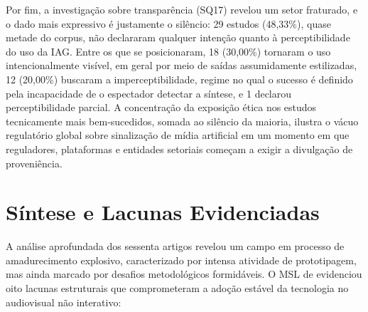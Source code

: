Por fim, a investigação sobre transparência (SQ17) revelou um setor fraturado, e o dado mais expressivo é justamente o silêncio: 29 estudos (48,33\%), quase metade do corpus, não declararam qualquer intenção quanto à perceptibilidade do uso da IAG. Entre os que se posicionaram, 18 (30,00\%) tornaram o uso intencionalmente visível, em geral por meio de saídas assumidamente estilizadas, 12 (20,00\%) buscaram a imperceptibilidade, regime no qual o sucesso é definido pela incapacidade de o espectador detectar a síntese, e 1 declarou perceptibilidade parcial. A concentração da exposição ética nos estudos tecnicamente mais bem-sucedidos, somada ao silêncio da maioria, ilustra o vácuo regulatório global sobre sinalização de mídia artificial em um momento em que reguladores, plataformas e entidades setoriais começam a exigir a divulgação de proveniência.

\section{Síntese e Lacunas Evidenciadas}

A análise aprofundada dos sessenta artigos revelou um campo em processo de amadurecimento explosivo, caracterizado por intensa atividade de prototipagem, mas ainda marcado por desafios metodológicos formidáveis. O MSL de \citet{RothAleo2026} evidenciou oito lacunas estruturais que comprometeram a adoção estável da tecnologia no audiovisual não interativo:

